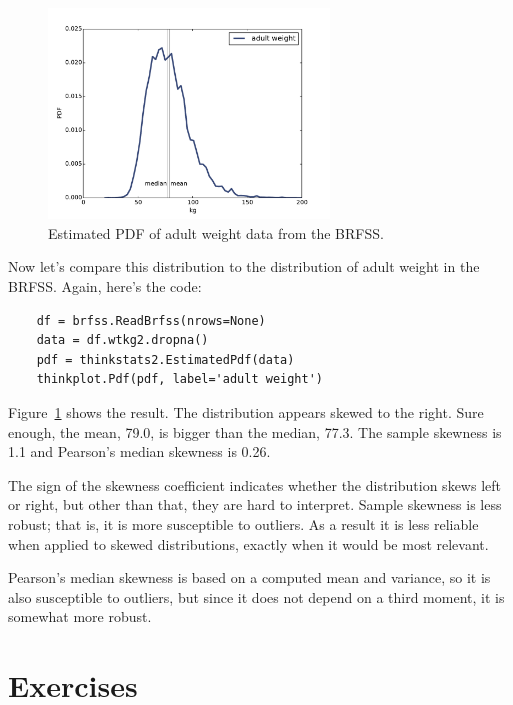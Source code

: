 \documentclass[12pt]{book}
\begin{document}
\begin{figure}
\centerline{\includegraphics[height=2.2in]{figs/density_wtkg2_kde.pdf}}
\caption{Estimated PDF of adult weight data from the BRFSS.}
\label{density_wtkg2_kde}
\end{figure}

Now let's compare this distribution to the distribution of adult
weight in the BRFSS.  Again, here's the code:

\begin{verbatim}
    df = brfss.ReadBrfss(nrows=None)
    data = df.wtkg2.dropna()
    pdf = thinkstats2.EstimatedPdf(data)
    thinkplot.Pdf(pdf, label='adult weight')
\end{verbatim}

Figure~\ref{density_wtkg2_kde} shows the result.  The distribution
appears skewed to the right.  Sure enough, the mean, 79.0, is bigger
than the median, 77.3.  The sample skewness is 1.1 and Pearson's
median skewness is 0.26.

The sign of the skewness coefficient indicates whether the distribution
skews left or right, but other than that, they are hard to interpret.
Sample skewness is less robust; that is, it is more
susceptible to outliers.  As a result it is less reliable
when applied to skewed distributions, exactly when it would be most
relevant.

Pearson's median skewness is based on a computed mean and variance,
so it is also susceptible to outliers, but since it does not depend
on a third moment, it is somewhat more robust.


\section{Exercises}
\end{document}
